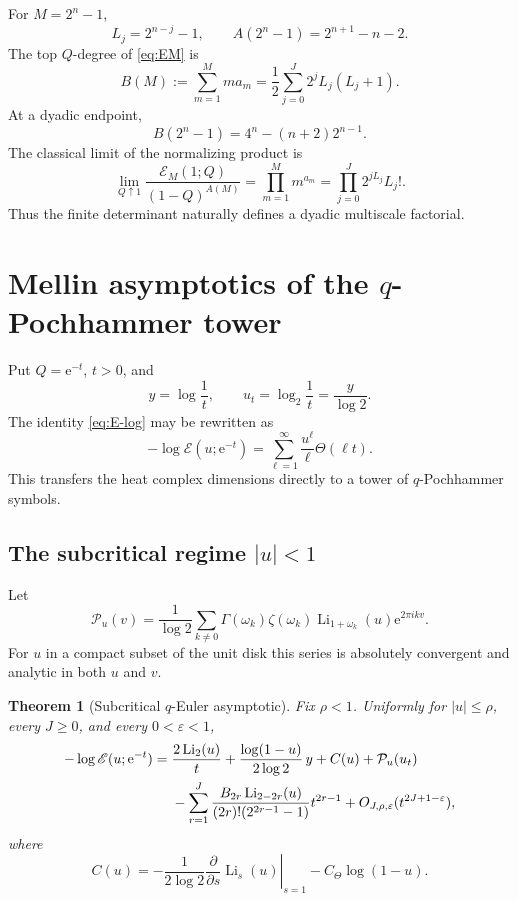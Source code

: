 \documentclass[11pt,oneside]{article}
\numberwithin{equation}{section}
\theoremstyle{plain}
\newtheorem{theorem}{Theorem}[section]
\theoremstyle{definition}
\theoremstyle{remark}
\newcommand{\Li}{\operatorname{Li}}
\newcommand{\Ecal}{\mathscr E}
\newcommand{\Pcal}{\mathcal P}
\newcommand{\e}{\mathrm e}
\begin{document}
For $M=2^n-1$,
\begin{equation}\label{eq:dyadic-L}
 L_j=2^{n-j}-1,
 \qquad
 A(2^n-1)=2^{n+1}-n-2.
\end{equation}
The top $Q$-degree of \cref{eq:EM} is
\begin{equation}\label{eq:B-M}
 B(M):=\sum_{m=1}^{M}ma_m
 =\frac12\sum_{j=0}^{J}2^jL_j(L_j+1).
\end{equation}
At a dyadic endpoint,
\begin{equation}\label{eq:B-dyadic}
 B(2^n-1)=4^n-(n+2)2^{n-1}.
\end{equation}
The classical limit of the normalizing product is
\begin{equation}\label{eq:multiscale-factorial}
 \lim_{Q\uparrow1}\frac{\Ecal_M(1;Q)}{(1-Q)^{A(M)}}
 =\prod_{m=1}^{M}m^{a_m}
 =\prod_{j=0}^{J}2^{jL_j}L_j!.
\end{equation}
Thus the finite determinant naturally defines a dyadic multiscale factorial.

\section{Mellin asymptotics of the $q$-Pochhammer tower}

Put $Q=\e^{-t}$, $t>0$, and
\[
 y=\log\frac1t,
 \qquad
 u_t=\log_2\frac1t=\frac y{\log2}.
\]
The identity \cref{eq:E-log} may be rewritten as
\begin{equation}\label{eq:E-Theta}
 -\log\Ecal(u;\e^{-t})
 =\sum_{\ell=1}^{\infty}\frac{u^\ell}{\ell}\Theta(\ell t).
\end{equation}
This transfers the heat complex dimensions directly to a tower of $q$-Pochhammer symbols.

\subsection{The subcritical regime $|u|<1$}

Let
\begin{equation}\label{eq:Pu}
 \Pcal_u(v)=\frac1{\log2}
 \sum_{k\ne0}\Gamma(\omega_k)\zeta(\omega_k)
 \Li_{1+\omega_k}(u)\e^{2\pi ikv}.
\end{equation}
For $u$ in a compact subset of the unit disk this series is absolutely convergent and analytic in both $u$ and $v$.

\begin{theorem}[Subcritical $q$-Euler asymptotic]\label{thm:E-subcritical}
Fix $\rho<1$.  Uniformly for $|u|\le\rho$, every $J\ge0$, and every $0<\varepsilon<1$,
\begin{align}\label{eq:E-subcritical-asymp}
 -\log\Ecal(u;\e^{-t})
 ={}&\frac{2\Li_2(u)}t
 +\frac{\log(1-u)}{2\log2}\,y
 +C(u)+\Pcal_u(u_t)\\
 &-\sum_{r=1}^{J}
 \frac{B_{2r}\Li_{2-2r}(u)}{(2r)!(2^{2r-1}-1)}t^{2r-1}
 +O_{J,\rho,\varepsilon}(t^{2J+1-\varepsilon}),\notag
\end{align}
where
\begin{equation}\label{eq:Cu}
 C(u)=-\frac1{2\log2}
 \left.\frac{\partial}{\partial s}\Li_s(u)\right|_{s=1}
 -C_\Theta\log(1-u).
\end{equation}
\end{theorem}
\end{document}
